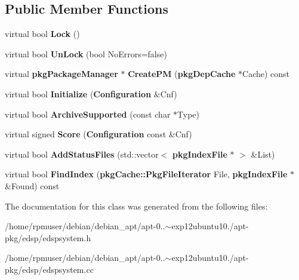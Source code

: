 \subsection*{\-Public \-Member \-Functions}
\begin{DoxyCompactItemize}
\item 
virtual bool {\bfseries \-Lock} ()\label{classedspSystem_a747fd95916e116a6ed37cc641e394c69}

\item 
virtual bool {\bfseries \-Un\-Lock} (bool \-No\-Errors=false)\label{classedspSystem_ab45e970c8ea44bbb120af41fc5e2a43f}

\item 
virtual {\bf pkg\-Package\-Manager} $\ast$ {\bfseries \-Create\-P\-M} ({\bf pkg\-Dep\-Cache} $\ast$\-Cache) const \label{classedspSystem_a9b88e90152156861fc5210e5598d69aa}

\item 
virtual bool {\bfseries \-Initialize} ({\bf \-Configuration} \&\-Cnf)\label{classedspSystem_a295ecf204cefa8729680c2cfdfe7051a}

\item 
virtual bool {\bfseries \-Archive\-Supported} (const char $\ast$\-Type)\label{classedspSystem_a4acb4ef24def19ad4b45c1f10d49f185}

\item 
virtual signed {\bfseries \-Score} ({\bf \-Configuration} const \&\-Cnf)\label{classedspSystem_ad46f817fa35d0bb611e490eb63d44c3d}

\item 
virtual bool {\bfseries \-Add\-Status\-Files} (std\-::vector$<$ {\bf pkg\-Index\-File} $\ast$ $>$ \&\-List)\label{classedspSystem_a87cb2c8845646cd04fb231da6f1721f7}

\item 
virtual bool {\bfseries \-Find\-Index} ({\bf pkg\-Cache\-::\-Pkg\-File\-Iterator} \-File, {\bf pkg\-Index\-File} $\ast$\&\-Found) const \label{classedspSystem_a5a001ca1f36543c5906681574a0b654d}

\end{DoxyCompactItemize}


\-The documentation for this class was generated from the following files\-:\begin{DoxyCompactItemize}
\item 
/home/rpmuser/debian/debian\-\_\-apt/apt-\/0..$\sim$exp12ubuntu10./apt-\/pkg/edsp/edspsystem.\-h\item 
/home/rpmuser/debian/debian\-\_\-apt/apt-\/0..$\sim$exp12ubuntu10./apt-\/pkg/edsp/edspsystem.\-cc\end{DoxyCompactItemize}

